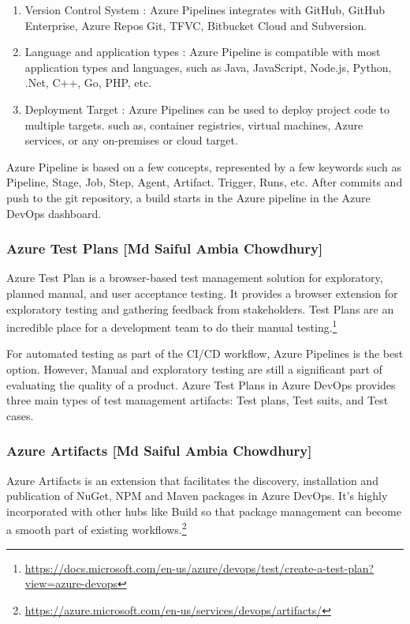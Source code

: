  \begin{enumerate}
     \item Version Control System : Azure Pipelines integrates with GitHub, GitHub Enterprise, Azure Repos Git, TFVC, Bitbucket Cloud and Subversion.
     \item Language and application types : Azure Pipeline is compatible with most application types and languages, such as Java, JavaScript, Node.js, Python, .Net, C++, Go, PHP, etc.
     \item Deployment Target :  Azure Pipelines can be used to deploy project code to multiple targets. such as, container registries, virtual machines, Azure services, or any on-premises or cloud target.
 \end{enumerate}
 
 Azure Pipeline is based on a few concepts, represented by a few keywords such as Pipeline, Stage, Job, Step, Agent, Artifact. Trigger, Runs, etc. After commits and push to the git repository, a build starts in the Azure pipeline in the Azure DevOps dashboard.
 

\subsubsection{Azure Test Plans [Md Saiful Ambia Chowdhury]}
%
Azure Test Plan is a browser-based test management solution for exploratory, planned manual, and user acceptance testing. It provides a browser extension for exploratory testing and gathering feedback from stakeholders. Test Plans are an incredible place for a development team to do their manual testing.\footnote{\url{https://docs.microsoft.com/en-us/azure/devops/test/create-a-test-plan?view=azure-devops}}

For automated testing as part of the CI/CD workflow, Azure Pipelines is the best option. However, Manual and exploratory testing are still a significant part of evaluating the quality of a product. Azure Test Plans in Azure DevOps provides three main types of test management artifacts: Test plans, Test suits, and Test cases. 

%

\subsubsection{Azure Artifacts [Md Saiful Ambia Chowdhury]}
%
Azure Artifacts is an extension that facilitates the discovery, installation and publication of NuGet, NPM and Maven packages in Azure DevOps. It’s highly incorporated with other hubs like Build so that package management can become a smooth part of existing workflows.\footnote{\url{https://azure.microsoft.com/en-us/services/devops/artifacts/}}
%

